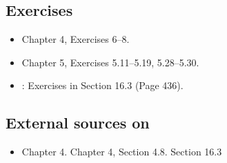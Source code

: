 





\subsection{Exercises} 

\begin{itemize}
\item \JE  Chapter 4, Exercises 6--8.
\item \DPV Chapter 5, Exercises 5.11--5.19, 5.28--5.30.
\item \CLRS: Exercises in Section 16.3 (Page 436).
\end{itemize}

\subsection{External sources on }
\begin{itemize}
\item \JE Chapter 4.  \KT Chapter 4, Section 4.8. \CLRS Section 16.3
\end{itemize}


